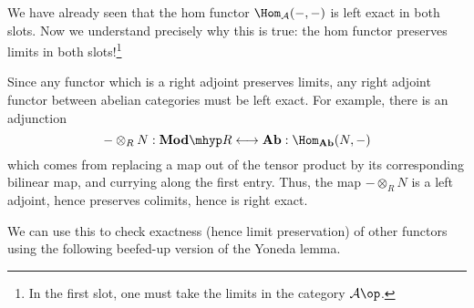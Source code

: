 \documentclass[main.tex]{subfiles}
\begin{document}
We have already seen that the hom functor $\Hom_{\mathcal{A}}(-,-)$ is left exact in both slots. Now we understand precisely why this is true: the hom functor preserves limits in both slots!\footnote{In the first slot, one must take the limits in the category $\mathcal{A}\op$.}

Since any functor which is a right adjoint preserves limits, any right adjoint functor between abelian categories must be left exact. For example, there is an adjunction
\begin{equation*}
  - \otimes_{R} N : \mathbf{Mod}\mhyp R \longleftrightarrow \mathbf{Ab} : \Hom_{\mathbf{Ab}}(N, -)
\end{equation*}
which comes from replacing a map out of the tensor product by its corresponding bilinear map, and currying along the first entry. Thus, the map $- \otimes_{R} N$ is a left adjoint, hence preserves colimits, hence is right exact.

We can use this to check exactness (hence limit preservation) of other functors using the following beefed-up version of the Yoneda lemma.
\end{document}
